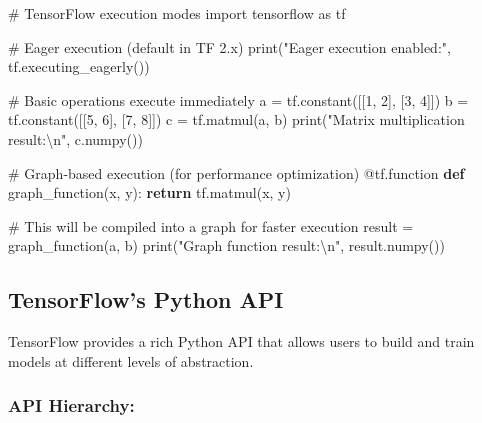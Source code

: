 \documentclass[
  letterpaper,
  DIV=11,
  numbers=noendperiod]{scrreprt}
\newenvironment{Shaded}{\begin{snugshade}}{\end{snugshade}}
\newcommand{\AttributeTok}[1]{\textcolor[rgb]{0.40,0.45,0.13}{#1}}
\newcommand{\BuiltInTok}[1]{\textcolor[rgb]{0.00,0.23,0.31}{#1}}
\newcommand{\CharTok}[1]{\textcolor[rgb]{0.13,0.47,0.30}{#1}}
\newcommand{\CommentTok}[1]{\textcolor[rgb]{0.37,0.37,0.37}{#1}}
\newcommand{\ControlFlowTok}[1]{\textcolor[rgb]{0.00,0.23,0.31}{\textbf{#1}}}
\newcommand{\DecValTok}[1]{\textcolor[rgb]{0.68,0.00,0.00}{#1}}
\newcommand{\ImportTok}[1]{\textcolor[rgb]{0.00,0.46,0.62}{#1}}
\newcommand{\KeywordTok}[1]{\textcolor[rgb]{0.00,0.23,0.31}{\textbf{#1}}}
\newcommand{\NormalTok}[1]{\textcolor[rgb]{0.00,0.23,0.31}{#1}}
\newcommand{\OperatorTok}[1]{\textcolor[rgb]{0.37,0.37,0.37}{#1}}
\newcommand{\StringTok}[1]{\textcolor[rgb]{0.13,0.47,0.30}{#1}}
\begin{document}
\begin{Shaded}
\begin{Highlighting}[]
\CommentTok{\# TensorFlow execution modes}
\ImportTok{import}\NormalTok{ tensorflow }\ImportTok{as}\NormalTok{ tf}

\CommentTok{\# Eager execution (default in TF 2.x)}
\BuiltInTok{print}\NormalTok{(}\StringTok{"Eager execution enabled:"}\NormalTok{, tf.executing\_eagerly())}

\CommentTok{\# Basic operations execute immediately}
\NormalTok{a }\OperatorTok{=}\NormalTok{ tf.constant([[}\DecValTok{1}\NormalTok{, }\DecValTok{2}\NormalTok{], [}\DecValTok{3}\NormalTok{, }\DecValTok{4}\NormalTok{]])}
\NormalTok{b }\OperatorTok{=}\NormalTok{ tf.constant([[}\DecValTok{5}\NormalTok{, }\DecValTok{6}\NormalTok{], [}\DecValTok{7}\NormalTok{, }\DecValTok{8}\NormalTok{]])}
\NormalTok{c }\OperatorTok{=}\NormalTok{ tf.matmul(a, b)}
\BuiltInTok{print}\NormalTok{(}\StringTok{"Matrix multiplication result:}\CharTok{\textbackslash{}n}\StringTok{"}\NormalTok{, c.numpy())}

\CommentTok{\# Graph{-}based execution (for performance optimization)}
\AttributeTok{@tf.function}
\KeywordTok{def}\NormalTok{ graph\_function(x, y):}
    \ControlFlowTok{return}\NormalTok{ tf.matmul(x, y)}

\CommentTok{\# This will be compiled into a graph for faster execution}
\NormalTok{result }\OperatorTok{=}\NormalTok{ graph\_function(a, b)}
\BuiltInTok{print}\NormalTok{(}\StringTok{"Graph function result:}\CharTok{\textbackslash{}n}\StringTok{"}\NormalTok{, result.numpy())}
\end{Highlighting}
\end{Shaded}

\subsection{TensorFlow's Python API}\label{tensorflows-python-api}

TensorFlow provides a rich Python API that allows users to build and
train models at different levels of abstraction.

\subsubsection{API Hierarchy:}\label{api-hierarchy}
\end{document}

